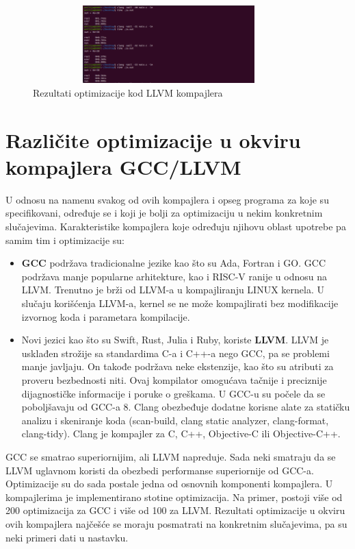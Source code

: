 \documentclass[a4paper]{article}
\begin{document}
\begin{figure}[h!]
    \begin{center}
        \includegraphics[width=105mm, height=30mm]{pics/test2.png}
    \end{center}
    \caption {Rezultati optimizacije kod LLVM kompajlera}
    \label{fig:Rezultati_optimizacije2}

\end{figure}

\newpage


\section{Različite optimizacije u okviru kompajlera GCC/LLVM}
\label{subsec:razlike}

U odnosu na namenu svakog od ovih kompajlera  i opseg programa za koje su specifikovani, određuje se i koji je bolji za optimizaciju u nekim konkretnim slučajevima.
Karakteristike kompajlera koje određuju njihovu oblast upotrebe pa samim tim i optimizacije su: 
\begin{itemize}
  \item \textbf{GCC} podržava tradicionalne jezike kao što su Ada, Fortran i GO.
         GCC podržava manje popularne arhitekture, kao i RISC-V ranije u odnosu na LLVM.
         Trenutno je brži od LLVM-a u  kompajliranju LINUX kernela. 
         U slučaju korišćenja LLVM-a, kernel se ne može kompajlirati bez modifikacije izvornog koda i parametara kompilacije.
  \item  Novi jezici  kao što su Swift, Rust, Julia i Ruby, koriste \textbf{LLVM}.
          LLVM je usklađen strožije sa standardima C-a i C++-a nego GCC, pa se problemi manje javljaju.
          On takođe podržava neke ekstenzije, kao što su atributi za proveru bezbednosti niti.
          Ovaj kompilator omogućava tačnije i preciznije dijagnostičke informacije i poruke o greškama. U GCC-u su počele da se poboljšavaju od GCC-a 8.
          Clang obezbeđuje dodatne korisne alate za statičku analizu i skeniranje koda (scan-build, clang static analyzer, clang-format, clang-tidy).
          Clang je kompajler  za C, C++, Objective-C ili Objective-C++.
\end{itemize}
GCC se smatrao superiornijim, ali LLVM napreduje. Sada neki smatraju da se LLVM uglavnom koristi da obezbedi performanse superiornije od GCC-a.
\\ Optimizacije su do sada postale jedna od osnovnih komponenti kompa\-jlera. 
U kompajlerima je implementirano stotine optimizacija. 
Na primer, postoji više od 200 optimizacija za GCC i više od 100 za LLVM.  
Rezultati optimizacije u okviru ovih kompajlera najčešće se moraju posmatrati na konkretnim slučajevima, pa  su neki primeri dati u nastavku.
\end{document}
